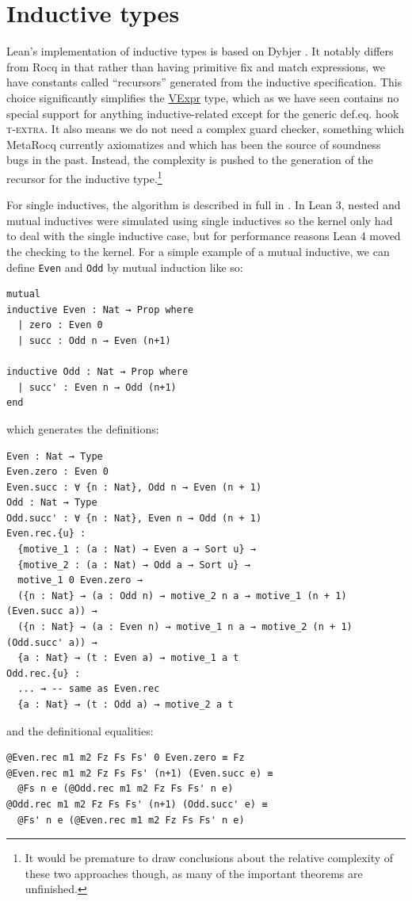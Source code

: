 \documentclass[sigplan,10pt,screen]{acmart}\settopmatter{printfolios=true,printccs=false,printacmref=false}
\newcommand{\code}[1]{\mbox{\ttfamily\small #1}}
\begin{document}
\section{Inductive types}\label{sec:inductive}

Lean's implementation of inductive types is based on Dybjer \cite{dybjer}. It notably differs from Rocq in that rather than having primitive \textsf{fix} and \textsf{match} expressions, we have constants called ``recursors'' generated from the inductive specification. This choice significantly simplifies the \href{https://github.com/digama0/lean4lean/blob/cpp2026/Lean4Lean/Theory/VExpr.lean#L6}{\code{VExpr}} type, which as we have seen contains no special support for anything inductive-related except for the generic def.eq. hook \textsc{t-extra}. It also means we do not need a complex guard checker, something which MetaRocq currently axiomatizes \cite{coqcoqcorrect} and which has been the source of soundness bugs in the past. Instead, the complexity is pushed to the generation of the recursor for the inductive type.\footnote{It would be premature to draw conclusions about the relative complexity of these two approaches though, as many of the important theorems are unfinished.}

For single inductives, the algorithm is described in full in \cite{leantt}. In Lean 3, nested and mutual inductives were simulated using single inductives so the kernel only had to deal with the single inductive case, but for performance reasons Lean 4 moved the checking to the kernel. For a simple example of a mutual inductive, we can define \lstinline|Even| and \lstinline|Odd| by mutual induction like so:
\begin{lstlisting}
mutual
inductive Even : Nat → Prop where
  | zero : Even 0
  | succ : Odd n → Even (n+1)

inductive Odd : Nat → Prop where
  | succ' : Even n → Odd (n+1)
end
\end{lstlisting}
which generates the definitions:
\begin{lstlisting}
Even : Nat → Type
Even.zero : Even 0
Even.succ : ∀ {n : Nat}, Odd n → Even (n + 1)
Odd : Nat → Type
Odd.succ' : ∀ {n : Nat}, Even n → Odd (n + 1)
Even.rec.{u} :
  {motive_1 : (a : Nat) → Even a → Sort u} →
  {motive_2 : (a : Nat) → Odd a → Sort u} →
  motive_1 0 Even.zero →
  ({n : Nat} → (a : Odd n) → motive_2 n a → motive_1 (n + 1) (Even.succ a)) →
  ({n : Nat} → (a : Even n) → motive_1 n a → motive_2 (n + 1) (Odd.succ' a)) →
  {a : Nat} → (t : Even a) → motive_1 a t
Odd.rec.{u} :
  ... → -- same as Even.rec
  {a : Nat} → (t : Odd a) → motive_2 a t
\end{lstlisting}
and the definitional equalities:
\begin{lstlisting}
@Even.rec m1 m2 Fz Fs Fs' 0 Even.zero ≡ Fz
@Even.rec m1 m2 Fz Fs Fs' (n+1) (Even.succ e) ≡
  @Fs n e (@Odd.rec m1 m2 Fz Fs Fs' n e)
@Odd.rec m1 m2 Fz Fs Fs' (n+1) (Odd.succ' e) ≡
  @Fs' n e (@Even.rec m1 m2 Fz Fs Fs' n e)
\end{lstlisting}
\end{document}
